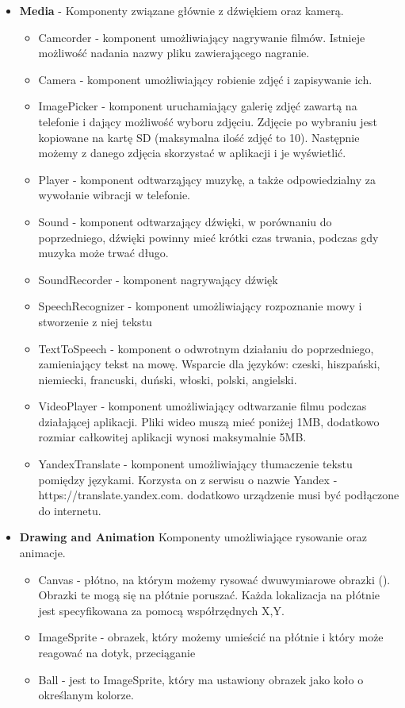 \begin{itemize}
\item \textbf{Media} - Komponenty związane głównie z dźwiękiem oraz kamerą.
\begin{itemize}
\item Camcorder - komponent umożliwiający nagrywanie filmów. Istnieje możliwość nadania nazwy pliku zawierającego nagranie.
\item Camera - komponent umożliwiający robienie zdjęć i zapisywanie ich.
\item ImagePicker - komponent uruchamiający galerię zdjęć zawartą na telefonie i dający możliwość wyboru zdjęciu. Zdjęcie po wybraniu jest kopiowane na kartę SD (maksymalna ilość zdjęć to 10). Następnie możemy z danego zdjęcia skorzystać w aplikacji i je wyświetlić.
\item Player - komponent odtwarząjący muzykę, a także odpowiedzialny za wywołanie wibracji w telefonie.
\item Sound - komponent odtwarzający dźwięki, w porównaniu do poprzedniego, dźwięki powinny mieć krótki czas trwania, podczas gdy muzyka może trwać długo.
\item SoundRecorder - komponent nagrywający dźwięk
\item SpeechRecognizer - komponent umożliwiający rozpoznanie mowy i stworzenie z niej tekstu
\item TextToSpeech - komponent o odwrotnym działaniu do poprzedniego, zamieniający tekst na mowę. Wsparcie dla języków: czeski, hiszpański, niemiecki, francuski, duński, włoski, polski, angielski.
\item VideoPlayer - komponent umożliwiający odtwarzanie filmu podczas działającej aplikacji. Pliki wideo muszą mieć poniżej 1MB, dodatkowo rozmiar całkowitej aplikacji wynosi maksymalnie 5MB.
\item YandexTranslate - komponent umożliwiający tłumaczenie tekstu pomiędzy językami. Korzysta on z serwisu o nazwie Yandex - https://translate.yandex.com. dodatkowo urządzenie musi być podłączone do internetu. 
\end{itemize}


\item \textbf{Drawing and Animation} Komponenty umożliwiające rysowanie oraz animacje.
\begin{itemize}
\item Canvas - płótno, na którym możemy rysować dwuwymiarowe obrazki (). Obrazki te mogą się na płótnie poruszać. Każda lokalizacja na płótnie jest specyfikowana za pomocą współrzędnych X,Y.
\item ImageSprite - obrazek, który możemy umieścić na płótnie i który może reagować na dotyk, przeciąganie
\item Ball - jest to ImageSprite, który ma ustawiony obrazek jako koło o określanym kolorze.
\end{itemize}


\end{itemize}
